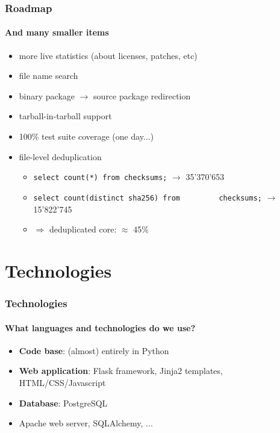 \documentclass{beamer}
\begin{document}
\begin{frame}
  \frametitle{Roadmap}
  \framesubtitle{And many smaller items}
  \begin{itemize}
  \item more live statistics (about licenses, patches, etc)
    \pause
  \item file name search
    \pause
  \item binary package $\to$ source package redirection
    \pause
  \item tarball-in-tarball support
    \pause
  \item 100\% test suite coverage (one day...)
    \pause
  \item file-level deduplication
    \begin{itemize}
    \item \lstinline[style=sql]{select count(*) from checksums;}
      \hfill $\rightarrow$ 35'370'653
    \item
      \lstinline[style=sql]{select count(distinct sha256) from
        checksums;}
      \hfill $\rightarrow$ 15'822'745
    \item[] \hfill $\Rightarrow$ \alert{deduplicated core:
      $\approx$ 45\%}
    \end{itemize}
  \end{itemize}
\end{frame}

\section{Technologies}

\begin{frame}
  \frametitle{Technologies}
  \framesubtitle{What languages and technologies do we use?}
  \begin{itemize}
  \item \textbf{Code base}: (almost) entirely in Python
    \pause
  \item \textbf{Web application}: Flask framework, Jinja2 templates,
    HTML/CSS/Javascript
    \pause
  \item \textbf{Database}: PostgreSQL
    \pause
  \item Apache web server, SQLAlchemy, ...
  \end{itemize}
\end{frame}
\end{document}

